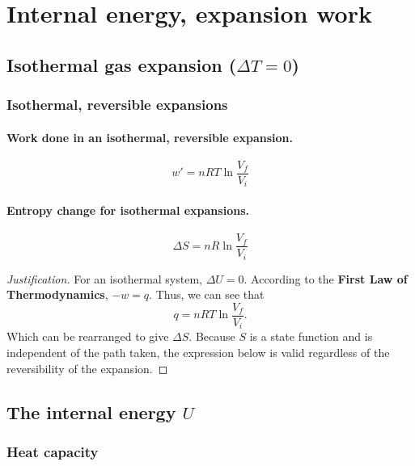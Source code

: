 \documentclass{article}
\numberwithin{theorem}{section}
\numberwithin{corollary}{section}
\numberwithin{postulate}{section}
\numberwithin{lemma}{section}
\numberwithin{definition}{section}
\newenvironment{justification} {\begin{proof}[Justification]} {\end{proof}}
\begin{document}
\section{Internal energy, expansion work}

\subsection{Isothermal gas expansion ($\Delta T = 0$)}

\subsubsection{Isothermal, reversible expansions}

\paragraph{Work done in an isothermal, reversible expansion. }

\begin{equation}
  w' = nRT\ln{\frac{V_f}{V_i}}
\end{equation}

\paragraph{Entropy change for isothermal expansions. }

\begin{equation}
  \Delta S = nR \ln{\frac{V_f}{V_i}}
\end{equation}

\begin{justification}
  For an isothermal system, $\Delta U = 0$. According to the \textbf{First Law
  of Thermodynamics}, $-w = q$. Thus, we can see that
  \begin{equation*}
      q = nRT\ln{\frac{V_f}{V_i}}.
  \end{equation*} Which can be rearranged to give $\Delta S$. Because $S$ is a
  state function and is independent of the path taken, the expression below is
  valid regardless of the reversibility of the expansion.
\end{justification}

\subsection{The internal energy $U$}

\subsubsection{Heat capacity}
\end{document}
